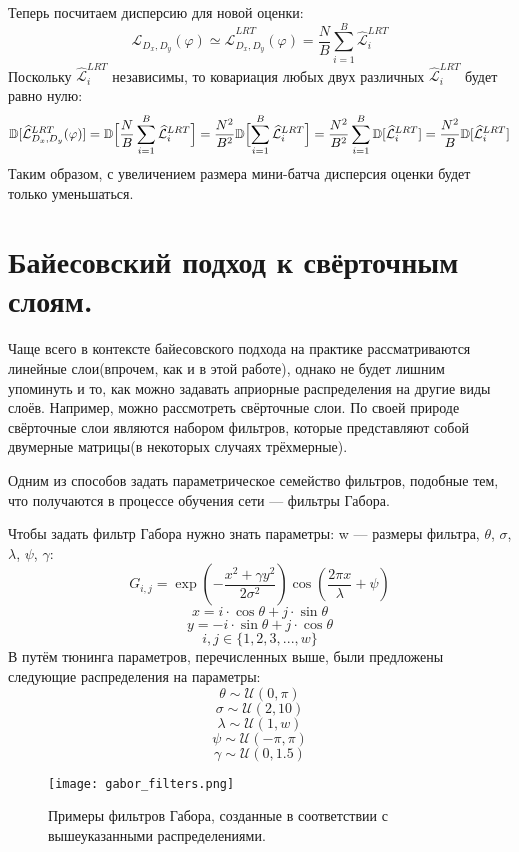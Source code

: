 Теперь посчитаем дисперсию для новой оценки:
$$\mathcal{L}_{D_x, D_y}(\varphi) \simeq \widehat{\mathcal{L}}_{D_x, D_y}^{LRT}(\varphi) = \frac{N}{B} \sum_{i=1}^B \widehat{\mathcal{L}}_{i}^{LRT}$$
Поскольку $\widehat{\mathcal{L}}_{i}^{LRT}$ независимы, то ковариация любых двух различных $\widehat{\mathcal{L}}_{i}^{LRT}$ будет равно нулю:
$$\mathbb{D}[\widehat{\mathcal{L}}_{D_x, D_y}^{LRT}(\varphi)] = \mathbb{D}\Bigl[\frac{N}{B} \sum_{i=1}^B \widehat{\mathcal{L}}_{i}^{LRT}\Bigr] = \frac{N^2}{B^2} \mathbb{D}\Bigl[\sum_{i=1}^B \widehat{\mathcal{L}}_{i}^{LRT}\Bigr] = \frac{N^2}{B^2} \sum_{i=1}^B \mathbb{D}[\widehat{\mathcal{L}}_{i}^{LRT}] = \frac{N^2}{B} \mathbb{D}[\widehat{\mathcal{L}}_{i}^{LRT}]$$
Таким образом, с увеличением размера мини-батча дисперсия оценки будет только уменьшаться.

\section{Байесовский подход к свёрточным слоям.}

Чаще всего в контексте байесовского подхода на практике рассматриваются линейные слои(впрочем, как и в этой работе), однако не будет лишним упоминуть и то, как
 можно задавать априорные распределения на другие виды слоёв. Например, можно рассмотреть свёрточные слои. По своей природе свёрточные слои являются набором фильтров, которые
 представляют собой двумерные матрицы(в некоторых случаях трёхмерные).

Одним из способов задать параметрическое семейство фильтров, подобные тем, что получаются в процессе обучения сети --- фильтры Габора.

Чтобы задать фильтр Габора нужно знать параметры: w --- размеры фильтра, $\theta$, $\sigma$, $\lambda$, $\psi$, $\gamma$:
$$G_{i,j} = \exp{(-\frac{x^2+\gamma y^2}{2\sigma^2})}\cos{(\frac{2\pi x}{\lambda} + \psi)}$$
$$x = i \cdot \cos{\theta} + j \cdot \sin{\theta}$$
$$y = -i \cdot \sin{\theta} + j \cdot \cos{\theta}$$
$$i,j \in \{1,2,3,...,w\}$$
В \cite{priors_for_cnn} путём тюнинга параметров, перечисленных выше, были предложены следующие распределения на параметры:
$$\theta \sim \mathcal{U}(0, \pi)$$
$$\sigma \sim \mathcal{U}(2, 10)$$
$$\lambda \sim \mathcal{U}(1, w)$$
$$\psi \sim \mathcal{U}(-\pi, \pi)$$
$$\gamma \sim \mathcal{U}(0, 1.5)$$

\begin{figure}[H]
    \centering
    \texttt{[image: gabor\_filters.png]}
    \caption{Примеры фильтров Габора, созданные в соответствии с вышеуказанными распределениями.}
    \label{fig:gabor_filters}
\end{figure}

